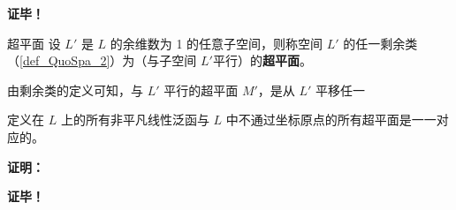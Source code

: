 \textbf{证毕！}

\begin{definition}{超平面}
设 $L'$ 是 $L$ 的余维数为 1 的任意子空间，则称空间 $L'$ 的任一剩余类（\autoref{def_QuoSpa_2}）为（与子空间 $L'$平行）的\textbf{超平面}。
\end{definition}
由剩余类的定义可知，与 $L'$ 平行的超平面 $M'$，是从 $L'$ 平移任一



\begin{theorem}{}
定义在 $L$ 上的所有非平凡线性泛函与 $L$ 中不通过坐标原点的所有超平面是一一对应的。
\end{theorem}

\textbf{证明：}


\textbf{证毕！}



